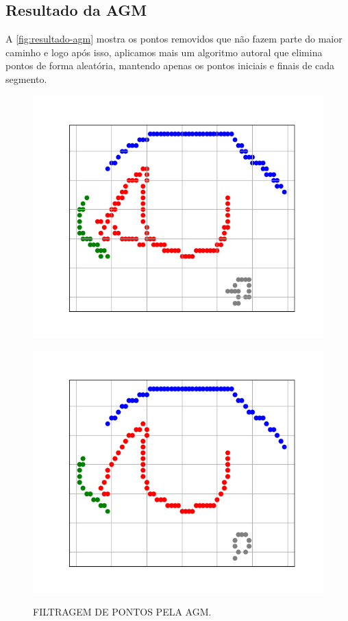\subsection{Resultado da AGM}
\label{sec:resultado-agm}

A \autoref{fig:resultado-agm} mostra os pontos removidos que não fazem parte do maior caminho e logo após isso, aplicamos mais um algoritmo autoral que elimina pontos de forma aleatória, mantendo apenas os pontos iniciais e finais de cada segmento.

\begin{figure}[h!]
    \caption{FILTRAGEM DE PONTOS PELA AGM.}
    \centering
    \begin{minipage}[b]{0.45\textwidth}
        \centering
        \includegraphics[width=0.9\linewidth]{fig/04_connected_components_right_eye.png}
        \label{fig:olho-grafo}
    \end{minipage}
    \hfill
    \begin{minipage}[b]{0.45\textwidth}
        \centering
        \includegraphics[width=0.9\linewidth]{fig/05_longest_path_right_eye.png}
        \label{fig:olho-agm}
    \end{minipage}


\end{figure}
